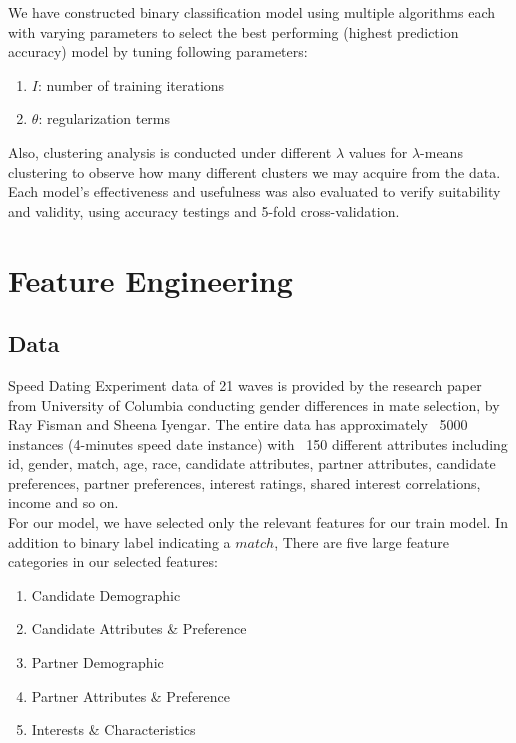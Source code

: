 \documentclass[11pt,letterpaper]{article}
\begin{document}
We have constructed binary classification model using multiple algorithms each with varying parameters to select the best performing (highest prediction accuracy) model by tuning following parameters:
\begin{enumerate}
\item $I$: number of training iterations
\item $\theta$: regularization terms
\end{enumerate}

Also, clustering analysis is conducted under different $\lambda$ values for $\lambda$-means clustering to observe how many different clusters we may acquire from the data.\\

Each model's effectiveness and usefulness was also evaluated to verify suitability and validity, using accuracy testings and 5-fold cross-validation.

\section{Feature Engineering}

\subsection{Data}
Speed Dating Experiment data of 21 waves is provided by the research paper from University of Columbia conducting gender differences in mate selection, by Ray Fisman and Sheena Iyengar. The entire data has approximately ~5000 instances (4-minutes speed date instance) with ~150 different attributes including id, gender, match, age, race, candidate attributes, partner attributes, candidate preferences, partner preferences, interest ratings, shared interest correlations, income and so on.\\

For our model, we have selected only the relevant features for our train model. In addition to binary label indicating a $match$, There are five large feature categories in our selected features:

\begin{enumerate}
\item Candidate Demographic
\item Candidate Attributes \& Preference
\item Partner Demographic
\item Partner Attributes \& Preference
\item Interests \& Characteristics
\end{enumerate}
\end{document}

